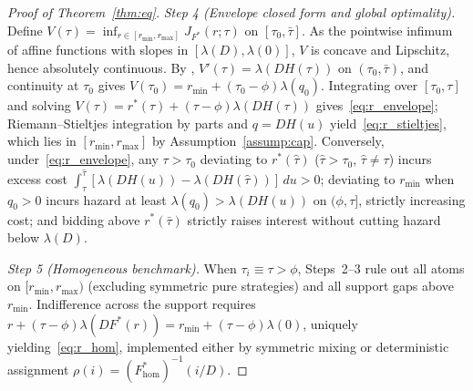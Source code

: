 \begin{proof}[Proof of Theorem~\ref{thm:eq}]
\emph{Step 4 (Envelope closed form and global optimality).} Define $V(\tau) = \inf_{r \in [r_{\min}, r_{\max}]} J_{F^*}(r; \tau)$ on $[\tau_0, \bar{\tau}]$. As the pointwise infimum of affine functions with slopes in $[\lambda(D), \lambda(0)]$, $V$ is concave and Lipschitz, hence absolutely continuous. By \citet{milgrom2002envelope}, $V'(\tau) = \lambda(D H(\tau))$ on $(\tau_0, \bar{\tau})$, and continuity at $\tau_0$ gives $V(\tau_0) = r_{\min} + (\tau_0 - \phi)\lambda(q_0)$. Integrating over $[\tau_0, \tau]$ and solving $V(\tau) = r^*(\tau) + (\tau - \phi)\lambda(D H(\tau))$ gives~\eqref{eq:r_envelope}; Riemann--Stieltjes integration by parts and $q = D H(u)$ yield~\eqref{eq:r_stieltjes}, which lies in $[r_{\min}, r_{\max}]$ by Assumption~\ref{assump:cap}. Conversely, under~\eqref{eq:r_envelope}, any $\tau > \tau_0$ deviating to $r^*(\hat{\tau})$ ($\hat{\tau} > \tau_0$, $\hat{\tau} \neq \tau$) incurs excess cost $\int_\tau^{\hat{\tau}} [\lambda(D H(u)) - \lambda(D H(\hat{\tau}))]\,du > 0$; deviating to $r_{\min}$ when $q_0 > 0$ incurs hazard at least $\lambda(q_0) > \lambda(D H(u))$ on $(\phi, \tau]$, strictly increasing cost; and bidding above $r^*(\bar{\tau})$ strictly raises interest without cutting hazard below $\lambda(D)$.

\emph{Step 5 (Homogeneous benchmark).} When $\tau_i \equiv \tau > \phi$, Steps~2--3 rule out all atoms on $[r_{\min}, r_{\max})$ (excluding symmetric pure strategies) and all support gaps above $r_{\min}$. Indifference across the support requires $r + (\tau - \phi)\lambda(D F^*(r)) = r_{\min} + (\tau - \phi)\lambda(0)$, uniquely yielding~\eqref{eq:r_hom}, implemented either by symmetric mixing or deterministic assignment $\rho(i) = (F_{\mathrm{hom}}^*)^{-1}(i/D)$.
\end{proof}

